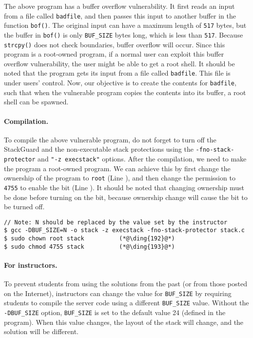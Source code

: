 The above program has a buffer overflow vulnerability. It first 
reads an input from a file called \texttt{badfile}, and then passes this
input to another buffer in the function {\tt bof()}. The 
original input can have a maximum length of \texttt{517} bytes, but the buffer
in {\tt bof()} is only \texttt{BUF\_SIZE} bytes long, which is less than
\texttt{517}. 
Because {\tt strcpy()} does not check
boundaries, buffer overflow will occur.
Since this program is a root-owned \setuid program, if a normal user can exploit
this buffer overflow vulnerability, the user might be 
able to get a root shell.
It should be noted that 
the program gets its input from a file called \texttt{badfile}. This file
is under users' control. Now, our objective is to 
create the contents for \texttt{badfile}, such that when the vulnerable program
copies the contents into its buffer, a root shell can be spawned.


\paragraph{Compilation.}
To compile the above vulnerable program, do not forget to 
turn off the StackGuard and the non-executable stack protections 
using the \texttt{-fno-stack-protector} and \texttt{"-z execstack"} options.
After the compilation, we need to make the program a
root-owned \setuid program. We can achieve this by first change the ownership of the program to
\texttt{root} (Line ), and then change the permission to \texttt{4755} to enable the
\setuid bit (Line ). It should be noted that changing ownership must be done before
turning on the \setuid bit, because ownership change will cause the \setuid bit to be turned
off.


\begin{lstlisting}
// Note: N should be replaced by the value set by the instructor
$ gcc -DBUF_SIZE=N -o stack -z execstack -fno-stack-protector stack.c
$ sudo chown root stack          (*@\ding{192}@*)
$ sudo chmod 4755 stack          (*@\ding{193}@*)
\end{lstlisting}
 

\paragraph{For instructors.}
To prevent students from using the solutions from the past (or from those
posted on the Internet), instructors can change the
value for \texttt{BUF\_SIZE} by requiring students to compile the
server code using a different \texttt{BUF\_SIZE} value.
Without the \texttt{-DBUF\_SIZE}
option, \texttt{BUF\_SIZE} is set to the default value 24 (defined
in the program).
When this value changes, the layout of the stack
will change, and the solution will be different.



